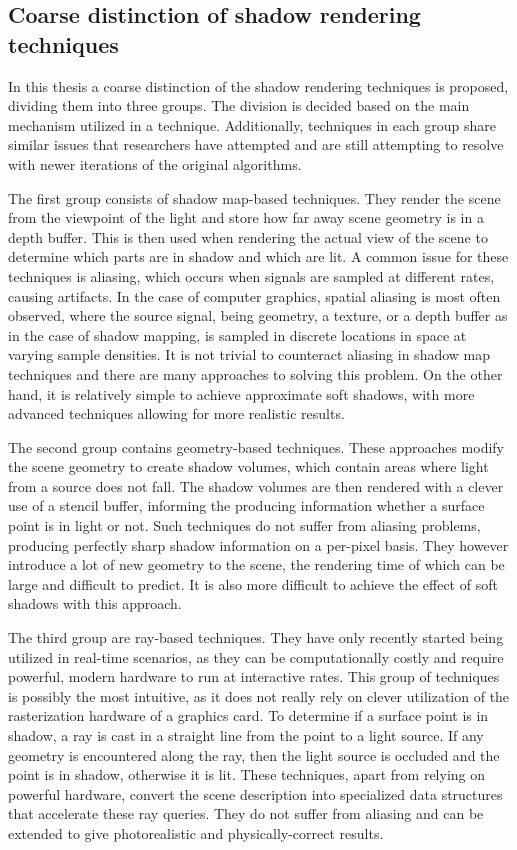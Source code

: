 \subsection{Coarse distinction of shadow rendering techniques}

In this thesis a coarse distinction of the shadow rendering techniques is proposed, dividing them into three groups. The division is decided based on the main mechanism utilized in a technique. Additionally, techniques in each group share similar issues that researchers have attempted and are still attempting to resolve with newer iterations of the original algorithms.

The first group consists of shadow map-based techniques. They render the scene from the viewpoint of the light and store how far away scene geometry is in a depth buffer. This is then used when rendering the actual view of the scene to determine which parts are in shadow and which are lit. A common issue for these techniques is aliasing, which occurs when signals are sampled at different rates, causing artifacts. In the case of computer graphics, spatial aliasing is most often observed, where the source signal, being geometry, a texture, or a depth buffer as in the case of shadow mapping, is sampled in discrete locations in space at varying sample densities. It is not trivial to counteract aliasing in shadow map techniques and there are many approaches to solving this problem. On the other hand, it is relatively simple to achieve approximate soft shadows, with more advanced techniques allowing for more realistic results.

The second group contains geometry-based techniques. These approaches modify the scene geometry to create shadow volumes, which contain areas where light from a source does not fall. The shadow volumes are then rendered with a clever use of a stencil buffer, informing the producing information whether a surface point is in light or not. Such techniques do not suffer from aliasing problems, producing perfectly sharp shadow information on a per-pixel basis. They however introduce a lot of new geometry to the scene, the rendering time of which can be large and difficult to predict. It is also more difficult to achieve the effect of soft shadows with this approach.

The third group are ray-based techniques. They have only recently started being utilized in real-time scenarios, as they can be computationally costly and require powerful, modern hardware to run at interactive rates. This group of techniques is possibly the most intuitive, as it does not really rely on clever utilization of the rasterization hardware of a graphics card. To determine if a surface point is in shadow, a ray is cast in a straight line from the point to a light source. If any geometry is encountered along the ray, then the light source is occluded and the point is in shadow, otherwise it is lit. These techniques, apart from relying on powerful hardware, convert the scene description into specialized data structures that accelerate these ray queries. They do not suffer from aliasing and can be extended to give photorealistic and physically-correct results.

